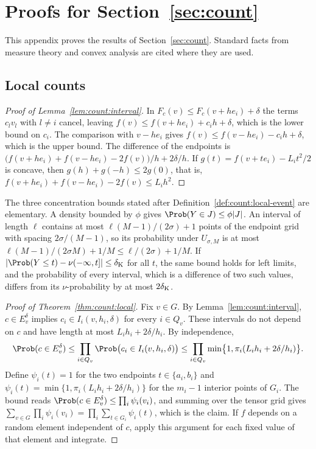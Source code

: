 \section{Proofs for Section~\ref{sec:count}}\label{app:count}

This appendix proves the results of Section~\ref{sec:count}. Standard facts
from measure theory and convex analysis are cited where they are used.

\subsection{Local counts}

\begin{proof}[Proof of Lemma~\ref{lem:count:interval}]
In $F_c(v)\le F_c(v+he_i)+\delta$ the terms $c_lv_l$ with $l\ne i$ cancel,
leaving $f(v)\le f(v+he_i)+c_ih+\delta$, which is the lower bound on $c_i$.
The comparison with $v-he_i$ gives $f(v)\le f(v-he_i)-c_ih+\delta$, which is
the upper bound. The difference of the endpoints is
$\bigl(f(v+he_i)+f(v-he_i)-2f(v)\bigr)/h+2\delta/h$. If
$g(t)=f(v+te_i)-L_it^2/2$ is concave, then $g(h)+g(-h)\le2g(0)$, that is,
$f(v+he_i)+f(v-he_i)-2f(v)\le L_ih^2$.
\end{proof}

The three concentration bounds stated after
Definition~\ref{def:count:local-event} are elementary. A density bounded by
$\phi$ gives $\Prob(Y\in J)\le\phi|J|$. An interval of length $\ell$ contains
at most $\ell(M-1)/(2\sigma)+1$ points of the endpoint grid with spacing
$2\sigma/(M-1)$, so its probability under $U_{\sigma,M}$ is at most
$\ell(M-1)/(2\sigma M)+1/M\le\ell/(2\sigma)+1/M$. If
$|\Prob(Y\le t)-\nu(-\infty,t]|\le\delta_{\rm K}$ for all $t$, the same bound
holds for left limits, and the probability of every interval, which is a
difference of two such values, differs from its $\nu$-probability by at most
$2\delta_{\rm K}$.

\begin{proof}[Proof of Theorem~\ref{thm:count:local}]
Fix $v\in G$. By Lemma~\ref{lem:count:interval}, $c\in E_v^\delta$ implies
$c_i\in I_i(v,h_i,\delta)$ for every $i\in Q_v$. These intervals do not
depend on $c$ and have length at most $L_ih_i+2\delta/h_i$. By independence,
\[
 \Prob(c\in E_v^\delta)\le\prod_{i\in Q_v}\Prob\bigl(c_i\in I_i(v,h_i,\delta)\bigr)
 \le\prod_{i\in Q_v}\min\bigl\{1,\pi_i(L_ih_i+2\delta/h_i)\bigr\}.
\]
Define $\psi_i(t)=1$ for the two endpoints $t\in\{a_i,b_i\}$ and
$\psi_i(t)=\min\{1,\pi_i(L_ih_i+2\delta/h_i)\}$ for the $m_i-1$ interior
points of $G_i$. The bound reads $\Prob(c\in E_v^\delta)\le\prod_i\psi_i(v_i)$,
and summing over the tensor grid gives
$\sum_{v\in G}\prod_i\psi_i(v_i)=\prod_i\sum_{t\in G_i}\psi_i(t)$, which is the
claim. If $f$ depends on a random element independent of $c$, apply this
argument for each fixed value of that element and integrate.
\end{proof}

